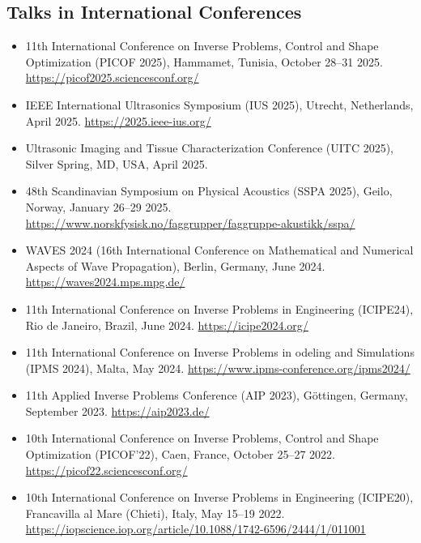 \documentclass[10pt]{article} %
\begin{document}
\subsection{Talks in International Conferences}
\begin{itemize}
\item 11th International Conference on Inverse Problems, Control and Shape Optimization (PICOF 2025), Hammamet, Tunisia, October 28--31 2025. \url{https://picof2025.sciencesconf.org/}
\item IEEE International Ultrasonics Symposium (IUS 2025), Utrecht, Netherlands, April 2025. \url{https://2025.ieee-ius.org/}
\item Ultrasonic Imaging and Tissue Characterization Conference (UITC 2025), Silver Spring, MD, USA, April 2025.
\item 48th Scandinavian Symposium on Physical Acoustics (SSPA 2025), Geilo, Norway, January 26--29 2025. \url{https://www.norskfysisk.no/faggrupper/faggruppe-akustikk/sspa/}
\item WAVES 2024 (16th International Conference on Mathematical and Numerical Aspects of Wave Propagation), Berlin, Germany, June 2024. \url{https://waves2024.mps.mpg.de/}
\item 11th International Conference on Inverse Problems in Engineering (ICIPE24), Rio de Janeiro, Brazil, June 2024. \url{https://icipe2024.org/}
\item 11th International Conference on Inverse Problems in odeling and Simulations (IPMS 2024), Malta, May 2024. \url{https://www.ipms-conference.org/ipms2024/}
\item 11th Applied Inverse Problems Conference (AIP 2023), Göttingen, Germany, September 2023. \url{https://aip2023.de/}
\item 10th International Conference on Inverse Problems, Control and Shape Optimization (PICOF'22), Caen, France, October 25--27 2022. \url{https://picof22.sciencesconf.org/}
\item 10th International Conference on Inverse Problems in Engineering (ICIPE20), Francavilla al Mare (Chieti), Italy, May 15--19 2022. \url{https://iopscience.iop.org/article/10.1088/1742-6596/2444/1/011001}
\end{itemize}
\end{document}
